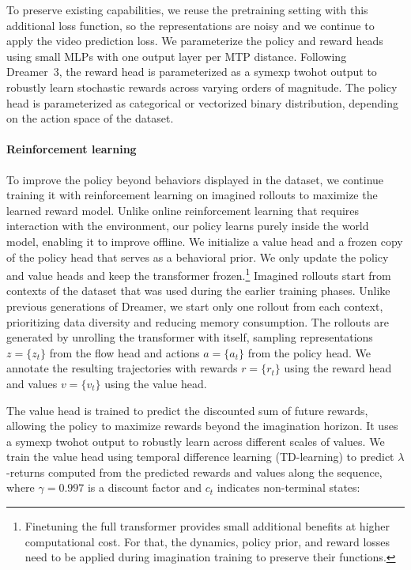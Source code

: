 \documentclass[11pt]{article}
\begin{document}
To preserve existing capabilities, we reuse the pretraining setting with this additional loss function, so the representations are noisy and we continue to apply the video prediction loss.
We parameterize the policy and reward heads using small MLPs with one output layer per MTP distance.
Following Dreamer~3, the reward head is parameterized as a symexp twohot output \citep{dreamerv3} to robustly learn stochastic rewards across varying orders of magnitude.
The policy head is parameterized as categorical or vectorized binary distribution, depending on the action space of the dataset.

\paragraph{Reinforcement learning}

To improve the policy beyond behaviors displayed in the dataset, we continue training it with reinforcement learning on imagined rollouts to maximize the learned reward model.
Unlike online reinforcement learning that requires interaction with the environment, our policy learns purely inside the world model, enabling it to improve offline.
We initialize a value head and a frozen copy of the policy head that serves as a behavioral prior.
We only update the policy and value heads and keep the transformer frozen.\footnote{Finetuning the full transformer provides small additional benefits at higher computational cost. For that, the dynamics, policy prior, and reward losses need to be applied during imagination training to preserve their functions.}
%
Imagined rollouts start from contexts of the dataset that was used during the earlier training phases.
Unlike previous generations of Dreamer, we start only one rollout from each context, prioritizing data diversity and reducing memory consumption.
The rollouts are generated by unrolling the transformer with itself, sampling representations $z=\{z_t\}$ from the flow head and actions $a=\{a_t\}$ from the policy head.
We annotate the resulting trajectories with rewards $r=\{r_t\}$ using the reward head and values $v=\{v_t\}$ using the value head.

The value head is trained to predict the discounted sum of future rewards, allowing the policy to maximize rewards beyond the imagination horizon.
It uses a symexp twohot output to robustly learn across different scales of values\citep{dreamerv3}.
We train the value head using temporal difference learning (TD-learning) \citep{sutton1988td} to predict $\lambda$-returns computed from the predicted rewards and values along the sequence, where $\gamma=0.997$ is a discount factor and $c_t$ indicates non-terminal states:
\end{document}
